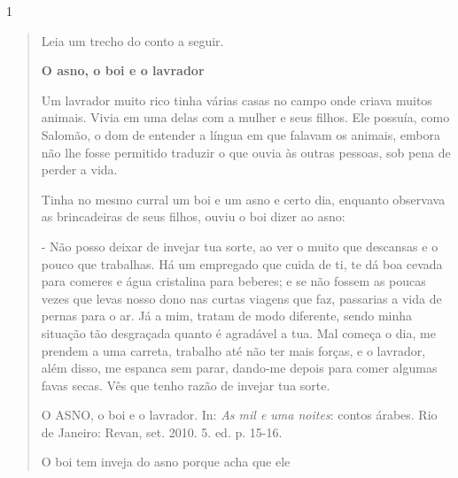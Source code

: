 \begin{esscolha}
\begin{esscolha}
\begin{esscolha}
\begin{esscolha}
\num{1}

\begin{quote}
Leia um trecho do conto a seguir.

\textbf{O asno, o boi e o lavrador}

Um lavrador muito rico tinha várias casas no campo onde criava muitos
animais. Vivia em uma delas com a mulher e seus filhos. Ele possuía,
como Salomão, o dom de entender a língua em que falavam os animais,
embora não lhe fosse permitido traduzir o que ouvia às outras pessoas,
sob pena de perder a vida.

Tinha no mesmo curral um boi e um asno e certo dia, enquanto observava
as brincadeiras de seus filhos, ouviu o boi dizer ao asno:

- Não posso deixar de invejar tua sorte, ao ver o muito que descansas e
o pouco que trabalhas. Há um empregado que cuida de ti, te dá boa cevada
para comeres e água cristalina para beberes; e se não fossem as poucas
vezes que levas nosso dono nas curtas viagens que faz, passarias a vida
de pernas para o ar. Já a mim, tratam de modo diferente, sendo minha
situação tão desgraçada quanto é agradável a tua. Mal começa o dia, me
prendem a uma carreta, trabalho até não ter mais forças, e o lavrador,
além disso, me espanca sem parar, dando-me depois para comer algumas
favas secas. Vês que tenho razão de invejar tua sorte.

O ASNO, o boi e o lavrador. In: \emph{As mil e uma noites}: contos
árabes. Rio de Janeiro: Revan, set. 2010. 5. ed. p. 15-16.

O boi tem inveja do asno porque acha que ele

\end{quote}
\end{esscolha}
\end{esscolha}
\end{esscolha}
\end{esscolha}

